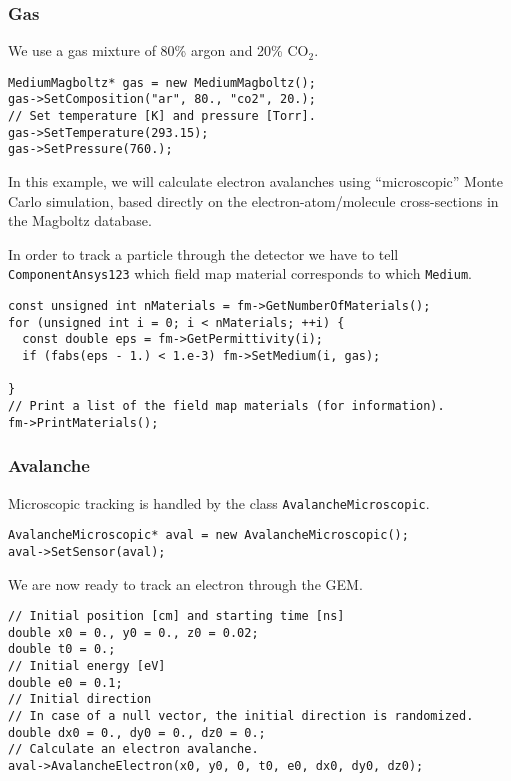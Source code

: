 \subsubsection{Gas}

We use a gas mixture of 80\% argon and 20\% CO\(_{2}\).
\begin{lstlisting}
MediumMagboltz* gas = new MediumMagboltz();
gas->SetComposition("ar", 80., "co2", 20.);
// Set temperature [K] and pressure [Torr].
gas->SetTemperature(293.15);
gas->SetPressure(760.);
\end{lstlisting}

In this example, we will calculate electron avalanches using 
``microscopic'' Monte Carlo simulation, based directly on the 
electron-atom/molecule cross-sections in the Magboltz database. 
 

In order to track a particle through the detector we have to 
tell \texttt{ComponentAnsys123} which field map material corresponds 
to which \texttt{Medium}.
\begin{lstlisting}
const unsigned int nMaterials = fm->GetNumberOfMaterials();
for (unsigned int i = 0; i < nMaterials; ++i) {
  const double eps = fm->GetPermittivity(i);
  if (fabs(eps - 1.) < 1.e-3) fm->SetMedium(i, gas);

}
// Print a list of the field map materials (for information).
fm->PrintMaterials();
\end{lstlisting}

\subsubsection{Avalanche}

Microscopic tracking is handled by the class 
\texttt{AvalancheMicroscopic}.
\begin{lstlisting}
AvalancheMicroscopic* aval = new AvalancheMicroscopic();
aval->SetSensor(aval);
\end{lstlisting}
We are now ready to track an electron through the GEM.  
\begin{lstlisting}
// Initial position [cm] and starting time [ns]
double x0 = 0., y0 = 0., z0 = 0.02;
double t0 = 0.;
// Initial energy [eV]
double e0 = 0.1;
// Initial direction 
// In case of a null vector, the initial direction is randomized.
double dx0 = 0., dy0 = 0., dz0 = 0.;
// Calculate an electron avalanche.
aval->AvalancheElectron(x0, y0, 0, t0, e0, dx0, dy0, dz0);
\end{lstlisting}

